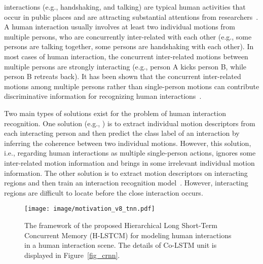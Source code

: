 \documentclass[9pt,journal,letterpaper,twocolumn]{IEEEtran}
\begin{document}
	
	




 interactions (e.g., handshaking, and talking) are typical human activities that occur in public places and are attracting substantial attentions from researchers~\cite{kong2014interactive,chang2015learning,choi2011learning,wang2017a}. A human interaction usually involves at least two individual motions from multiple persons, who are concurrently inter-related with each other (e.g., some persons are talking together, some persons are handshaking with each other). In most cases of human interaction, the concurrent inter-related motions between multiple persons are strongly interacting (e.g., person A kicks person B, while person B retreats back). It has been shown that the concurrent inter-related motions among multiple persons rather than single-person motions can contribute discriminative information for recognizing human interactions~\cite{kong2016close}. 



	
	Two main types of solutions exist for the problem of human interaction recognition. One solution (e.g., \cite{kong2014interactive,kong2012leraning,chang2015learning,zhang2012spatio}) is to extract individual motion descriptors from each interacting person and then predict the class label of an interaction by inferring the coherence between two individual motions. However, this solution, i.e., regarding human interactions as multiple single-person actions, ignores some inter-related motion information and brings in some irrelevant individual motion information. The other solution is to extract motion descriptors on interacting regions and then train an interaction recognition model~\cite{kong2016close}. However, interacting regions are difficult to locate before the close interaction occurs. 
	
	
	
	\begin{figure}[t]
		\centering
		\vspace{-0mm}
		\texttt{[image: image/motivation\_v8\_tnn.pdf]}
		\vspace{-4mm}
		\caption{The framework of the proposed Hierarchical Long Short-Term Concurrent Memory (H-LSTCM) for modeling human interactions in a human interaction scene. The details of  Co-LSTM unit is displayed in Figure~\ref{fig_crnn}.}\label{fig_idea}
\vspace{-3mm}
	\end{figure}
	
\end{document}
